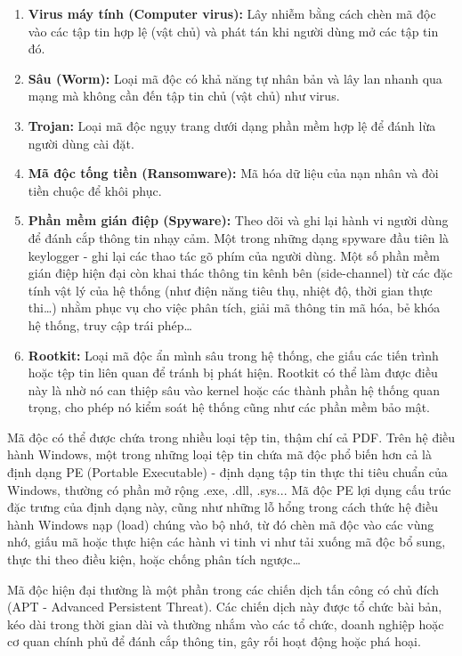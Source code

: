 \begin{enumerate}
    \item \textbf{Virus máy tính (Computer virus):}
	Lây nhiễm bằng cách chèn mã độc vào các tập tin hợp lệ
	(vật chủ) và phát tán khi người dùng mở các tập tin đó.

	\item \textbf{Sâu (Worm):} Loại mã độc có khả năng
	tự nhân bản và lây lan nhanh qua mạng mà không cần
	đến tập tin chủ (vật chủ) như virus.

    \item \textbf{Trojan:} Loại mã độc ngụy trang dưới
	dạng phần mềm hợp lệ để đánh lừa người dùng cài đặt.

    \item \textbf{Mã độc tống tiền (Ransomware):}
	Mã hóa dữ liệu của nạn nhân và đòi tiền chuộc để khôi phục.

    \item \textbf{Phần mềm gián điệp (Spyware):}
	Theo dõi và ghi lại hành vi người dùng để đánh cắp thông
	tin nhạy cảm. Một trong những dạng spyware đầu tiên là
	keylogger - ghi lại các thao tác gõ phím của người dùng.
	Một số phần mềm gián điệp hiện đại còn khai thác thông
	tin kênh bên (side-channel) từ các đặc tính vật lý của
	hệ thống (như điện năng tiêu thụ, nhiệt độ, thời gian
	thực thi\dots) nhằm phục vụ cho việc phân tích, giải mã
	thông tin mã hóa, bẻ khóa hệ thống, truy cập trái
	phép\dots

    \item \textbf{Rootkit:} Loại mã độc ẩn mình sâu trong
	hệ thống, che giấu các tiến trình hoặc tệp tin liên
	quan để tránh bị phát hiện. Rootkit có thể làm được
	điều này là nhờ nó can thiệp sâu vào kernel hoặc
	các thành phần hệ thống quan trọng, cho phép nó
	kiểm soát hệ thống cũng như các phần mềm bảo mật.
\end{enumerate}

Mã độc có thể được chứa trong nhiều loại tệp tin, thậm chí cả PDF.
Trên hệ điều hành Windows, một trong những loại tệp tin chứa mã độc
phổ biến hơn cả là định dạng PE (Portable Executable) - định dạng
tập tin thực thi tiêu chuẩn của Windows, thường có phần mở rộng
.exe, .dll, .sys... Mã độc PE lợi dụng cấu trúc đặc trưng của
định dạng này, cũng như những lỗ hổng trong cách thức hệ điều hành
Windows nạp (load) chúng vào bộ nhớ, từ đó chèn mã độc vào các
vùng nhớ, giấu mã hoặc thực hiện các hành vi tinh vi như tải
xuống mã độc bổ sung, thực thi theo điều kiện, hoặc chống phân
tích ngược\dots

Mã độc hiện đại thường là một phần trong các chiến dịch tấn công
có chủ đích (APT - Advanced Persistent Threat). Các chiến dịch
này được tổ chức bài bản, kéo dài trong thời gian dài và thường
nhắm vào các tổ chức, doanh nghiệp hoặc cơ quan chính phủ để
đánh cắp thông tin, gây rối hoạt động hoặc phá hoại. \cite{wikiapt}


